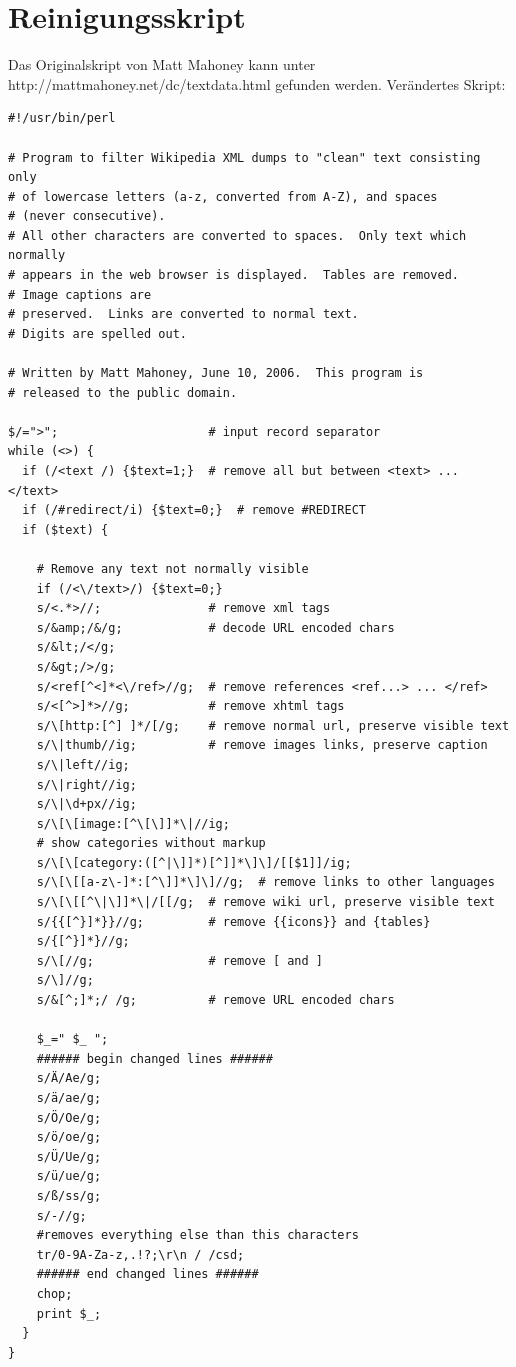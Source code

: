 \documentclass[12pt,a4paper]{report}
\begin{document}
\newpage
\section{Reinigungsskript}
	\label{sec:Perlskript}
Das Originalskript von Matt Mahoney kann unter http://mattmahoney.net/dc/textdata.html gefunden werden.
Verändertes Skript:\\
\begin{verbatim}
#!/usr/bin/perl

# Program to filter Wikipedia XML dumps to "clean" text consisting only 
# of lowercase letters (a-z, converted from A-Z), and spaces 
# (never consecutive).
# All other characters are converted to spaces.  Only text which normally
# appears in the web browser is displayed.  Tables are removed.  
# Image captions are
# preserved.  Links are converted to normal text.  
# Digits are spelled out.

# Written by Matt Mahoney, June 10, 2006.  This program is 
# released to the public domain.

$/=">";                     # input record separator
while (<>) {
  if (/<text /) {$text=1;}  # remove all but between <text> ... </text>
  if (/#redirect/i) {$text=0;}  # remove #REDIRECT
  if ($text) {

    # Remove any text not normally visible
    if (/<\/text>/) {$text=0;}
    s/<.*>//;               # remove xml tags
    s/&amp;/&/g;            # decode URL encoded chars
    s/&lt;/</g;
    s/&gt;/>/g;
    s/<ref[^<]*<\/ref>//g;  # remove references <ref...> ... </ref>
    s/<[^>]*>//g;           # remove xhtml tags
    s/\[http:[^] ]*/[/g;    # remove normal url, preserve visible text
    s/\|thumb//ig;          # remove images links, preserve caption
    s/\|left//ig;
    s/\|right//ig;
    s/\|\d+px//ig;
    s/\[\[image:[^\[\]]*\|//ig;
    # show categories without markup
    s/\[\[category:([^|\]]*)[^]]*\]\]/[[$1]]/ig;  
    s/\[\[[a-z\-]*:[^\]]*\]\]//g;  # remove links to other languages
    s/\[\[[^\|\]]*\|/[[/g;  # remove wiki url, preserve visible text
    s/{{[^}]*}}//g;         # remove {{icons}} and {tables}
    s/{[^}]*}//g;
    s/\[//g;                # remove [ and ]
    s/\]//g;
    s/&[^;]*;/ /g;          # remove URL encoded chars

    $_=" $_ ";
    ###### begin changed lines ######
    s/Ä/Ae/g;
    s/ä/ae/g;
    s/Ö/Oe/g;
    s/ö/oe/g;
    s/Ü/Ue/g;
    s/ü/ue/g;
    s/ß/ss/g;
    s/-//g;
    #removes everything else than this characters
    tr/0-9A-Za-z,.!?;\r\n / /csd; 
    ###### end changed lines ######
    chop;
    print $_;
  }
}
	\end{verbatim}
\end{document}
